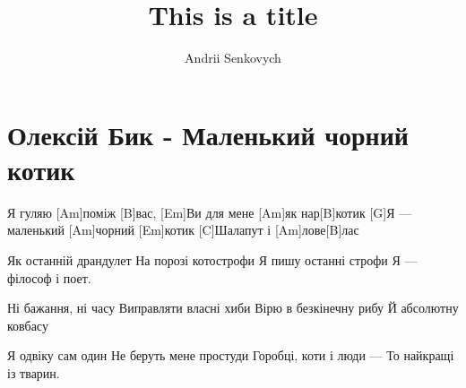 \documentclass[a4paper]{article}
\title{This is a title}
\author{Andrii Senkovych}
\begin{document}
\section{Олексій Бик - Маленький чорний котик}
\begin{guitar}
[Em]Я гуляю [Am]поміж [B]вас,
[Em]Ви для мене [Am]як нар[B]котик
[G]Я — маленький [Am]чорний [Em]котик
[C]Шалапут і [Am]лове[B]лас

Як останній драндулет
На порозі котострофи
Я пишу останні строфи
Я — філософ і поет.

Ні бажання, ні часу
Виправляти власні хиби
Вірю в безкінечну рибу 
Й абсолютну ковбасу

Я одвіку сам один
Не беруть мене простуди
Горобці, коти і люди —
То найкращі із тварин.
\end{guitar}
\end{document}
